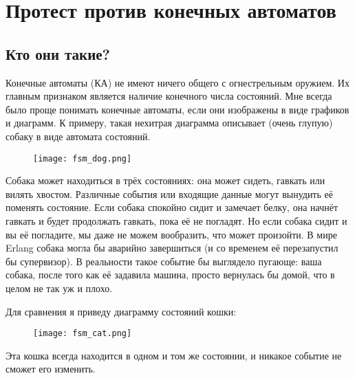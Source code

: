 \chapter{Протест против конечных автоматов}
\label{rage-against-the-finite-state-machines}
\section{Кто они такие?}
\label{what-are-they}
Конечные автоматы (КА) не имеют ничего общего с огнестрельным оружием.
Их главным признаком является наличие конечного числа состояний.
Мне всегда было проще понимать конечные автоматы, если они изображены в виде графиков и диаграмм.
К примеру, такая нехитрая диаграмма описывает (очень глупую) собаку в виде автомата состояний.
\begin{figure}[h!]
    \centering
    \texttt{[image: fsm\_dog.png]}
\end{figure}
Собака может находиться в трёх состояниях: она может сидеть, гавкать или вилять хвостом.
Различные события или входящие данные могут вынудить её поменять состояние.
Если собака спокойно сидит и замечает белку, она начнёт гавкать и будет продолжать гавкать, пока её не погладят.
Но если собака сидит и вы её погладите, мы даже не можем вообразить, что может произойти.
В мире Erlang собака могла бы аварийно завершиться (и со временем её перезапустил бы супервизор).
В реальности такое событие бы выглядело пугающе: ваша собака, после того как её задавила машина, просто вернулась бы домой, что в целом не так уж и плохо.

Для сравнения я приведу диаграмму состояний кошки:

\begin{figure}[h!]
    \centering
    \texttt{[image: fsm\_cat.png]}
\end{figure}

Эта кошка всегда находится в одном и том же состоянии, и никакое событие не сможет его изменить.

